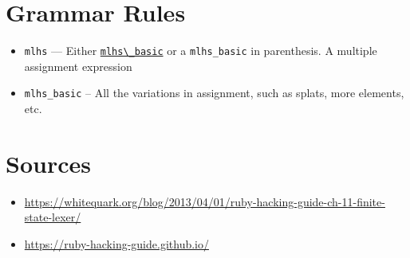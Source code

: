 \documentclass[11pt]{article}
\begin{document}
\section{Grammar Rules}
\label{sec-7}
\begin{itemize}
\item \label{mlhs} \verb~mlhs~ --- Either \hyperref[mlhs_basic]{\verb~mlhs\_basic~} or a \verb~mlhs_basic~ in
parenthesis. A multiple assignment expression
\item \label{mlhs_basic} \verb~mlhs_basic~ -- All the variations in assignment,
such as splats, more elements, etc.
\end{itemize}

\section{Sources}
\label{sec-8}

\begin{itemize}
\item \url{https://whitequark.org/blog/2013/04/01/ruby-hacking-guide-ch-11-finite-state-lexer/}
\item \url{https://ruby-hacking-guide.github.io/}
\end{itemize}
\end{document}
